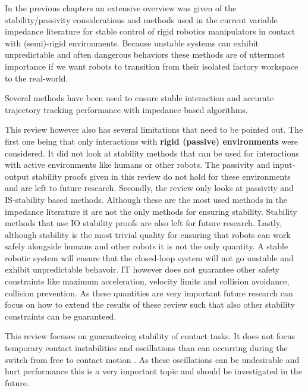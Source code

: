In the previous chapters an extensive overview was given of the stability/passivity considerations and methods used in the current variable impedance literature for stable control of rigid robotics manipulators in contact with (semi)-rigid environments. Because unstable systems can exhibit unpredictable and often dangerous behaviors these methods are of uttermost importance if we want robots to transition from their isolated factory workspace to the real-world. 

Several methods have been used to ensure stable interaction and accurate trajectory tracking performance with impedance based algorithms. 



This review however also has several limitations that need to be pointed out. The first one being that only interactions with \textbf{rigid (passive) environments} were considered. It did not look at stability methods that can be used for interactions with active environments like humans or other robots. The passivity and input-output stability proofs given in this review do not hold for these environments and are left to future research. Secondly, the review only looks at passivity and IS-stability based methods. Although these are the most used methods in the impedance literature it are not the only methods for ensuring stability. Stability methods that use IO stability proofs are also left for future research. Lastly, although stability is the most trivial quality for ensuring that robots can work safely alongside humans and other robots it is not the only quantity. A stable robotic system will ensure that the closed-loop system will not go unstable and exhibit unpredictable behavoir. IT however does not guarantee other safety constraints like maximum acceleration, velocity limits and collision avoidance, collision prevention. As these quantities are very important future research can focus on how to extend the results of these review such that also other stability constraints can be guaranteed.

This review focuses on guaranteeing stability of contact tasks. It does not focus temporary contact instabilities and oscillations than can occurring during the switch from free to contact motion \cite{khansariAdaptiveHumaninspiredCompliant2016,salehianDynamicalSystemBasedApproachControlling2018}. As these oscillations can be undesirable and hurt performance this is a very important topic and should be investigated in the future.

